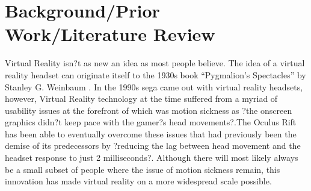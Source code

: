 \documentclass[a4paper]{article}
\begin{document}
\section{Background/Prior Work/Literature Review}


\indent \indent Virtual Reality isn?t as new an idea as most people believe. The idea of a virtual reality headset can originate itself to the 1930s book ``Pygmalion's Spectacles'' by Stanley G. Weinbaum \cite{1}. In the 1990s sega came out with virtual reality headsets, however, Virtual Reality technology at the time suffered from a myriad of usability issues at the forefront of which was motion sickness as ?the onscreen graphics didn?t keep pace with the gamer?s head movements?\cite{2}.The Oculus Rift has been able to eventually overcome these issues that had previously been the demise of its predecessors by ?reducing the lag between head movement and the headset response to just 2 milliseconds?\cite{2}. Although there will most likely always be a small subset of people where the issue of motion sickness remain, this  innovation has made virtual reality on a more widespread scale possible.\\
\end{document}
